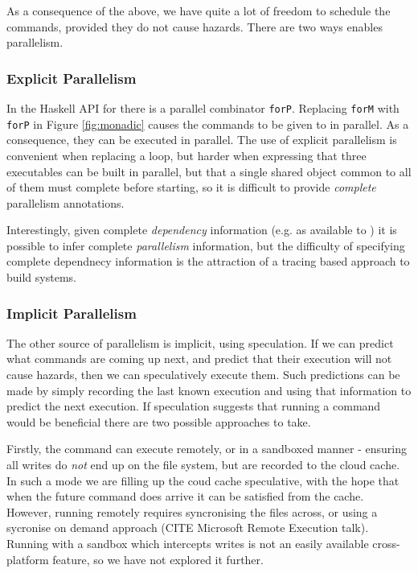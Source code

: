 As a consequence of the above, we have quite a lot of freedom to schedule the commands, provided they do not cause hazards.  There are two ways \Rattle enables parallelism.

\subsubsection{Explicit Parallelism}

In the Haskell API for \Rattle there is a parallel combinator \texttt{forP}. Replacing \texttt{forM} with \texttt{forP} in Figure \ref{fig:monadic} causes the commands to be given to \Rattle in parallel. As a consequence, they can be executed in parallel. The use of explicit parallelism is convenient when replacing a loop, but harder when expressing that three executables can be built in parallel, but that a single shared object common to all of them must complete before starting, so it is difficult to provide \emph{complete} parallelism annotations.

Interestingly, given complete \emph{dependency} information (e.g. as available to \Make) it is possible to infer complete \emph{parallelism} information, but the difficulty of specifying complete dependnecy information is the attraction of a tracing based approach to build systems.

\subsubsection{Implicit Parallelism}
\label{sec:speculation}

The other source of parallelism is implicit, using speculation. If we can predict what commands are coming up next, and predict that their execution will not cause hazards, then we can speculatively execute them.  Such predictions can be made by simply recording the last known execution and using that information to predict the next execution.  If speculation suggests that running a command would be beneficial there are two possible approaches to take.

Firstly, the command can execute remotely, or in a sandboxed manner - ensuring all writes do \emph{not} end up on the file system, but are recorded to the cloud cache. In such a mode we are filling up the coud cache speculative, with the hope that when the future command does arrive it can be satisfied from the cache. However, running remotely requires syncronising the files across, or using a sycronise on demand approach (CITE Microsoft Remote Execution talk). Running with a sandbox which intercepts writes is not an easily available cross-platform feature, so we have not explored it further.

